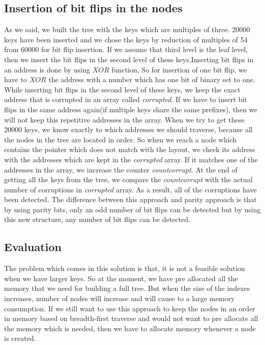 \documentclass{report}
\begin{document}
\subsection{Insertion of bit flips in the nodes}

As we said, we built the tree with the keys which are multiples of three. 20000 keys have been inserted and we chose the keys by reduction of multiples of 54 from 60000 for bit flip insertion. If we assume that third level is the leaf level, then we insert the bit flips in the second level of these keys.Inserting bit flips in an address is done by using $XOR$ function, So for insertion of one bit flip, we have to $XOR$ the address with a number which has one bit of binary set to one. While inserting bit flips in the second level of these keys, we keep the exact address that is corrupted in an array called \textit{corrupted}. If we have to insert bit flips in the same address again(if multiple keys share the same prefixes), then we will not keep this repetitive addresses in the array. When we try to get these 20000 keys, we know exactly to which addresses we should traverse, because all the nodes in the tree are located in order. So when we reach a node which contains the pointer which does not match with the layout, we check its address with the addresses which are kept in the \textit{corrupted} array. If it matches one of the addresses in the array, we increase the counter  \textit{countcorrupt}. At the end of getting all the keys from the tree, we compare the \textit{countcorrupt} with the actual number of corruptions in \textit{corrupted} array. As a result, all of the corruptions have been detected. The difference between this approach and parity approach is that by using parity bits, only an odd number of bit flips can be detected but by using this new structure, any number of bit flips can be detected.

\subsection{Evaluation}
The problem which comes in this solution is that, it is not a feasible solution when we have larger keys. So at the moment, we have pre allocated all the memory that we need for building a full tree. But when the size of the indexes increases, number of nodes will increase and will cause to a large memory consumption. If we still want to use this approach to keep the nodes in an order in memory based on breadth-first traverse and would not want to pre allocate all the memory which is needed, then we have to allocate memory whenever a node is created.
\end{document}
